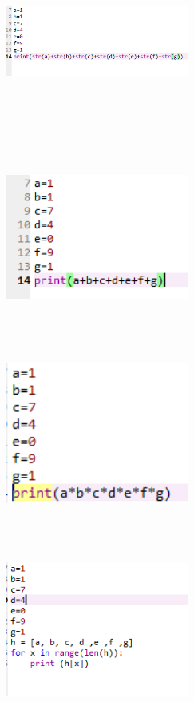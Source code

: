 \begin{enumerate}
\begin{figure}
\end{figure}
\begin{figure}
\item
\center
\includegraphics[width=6cm,height=6cm]{figures/c15.png}
\end{figure}
\begin{figure}
\item
\center
\includegraphics[width=6cm,height=6cm]{figures/c16.png}
\end{figure}
\begin{figure}
\item
\center
\includegraphics[width=6cm,height=6cm]{figures/c17.png}
\end{figure}
\begin{figure}
\item
\center
\includegraphics[width=6cm,height=6cm]{figures/c18.png}

\end{figure}
\end{enumerate}
